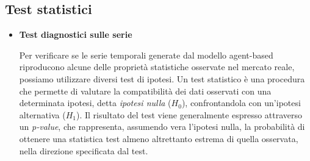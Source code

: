 \subsection{Test statistici}
\begin{itemize}
        
        
        
        
    \item \textbf{Test diagnostici sulle serie}

    Per verificare se le serie temporali generate dal modello agent-based riproducono alcune delle proprietà statistiche osservate nel mercato reale,
    possiamo utilizzare diversi test di ipotesi.
    Un test statistico è una procedura che permette di valutare la compatibilità dei dati osservati con una determinata ipotesi, detta \textit{ipotesi nulla}
    ($H_0$), confrontandola con un'ipotesi alternativa ($H_1$).
    Il risultato del test viene generalmente espresso attraverso un \textit{p-value}, che rappresenta, assumendo vera l'ipotesi nulla,
    la probabilità di ottenere una statistica test almeno altrettanto estrema di quella osservata, nella direzione specificata dal test.


\end{itemize}
